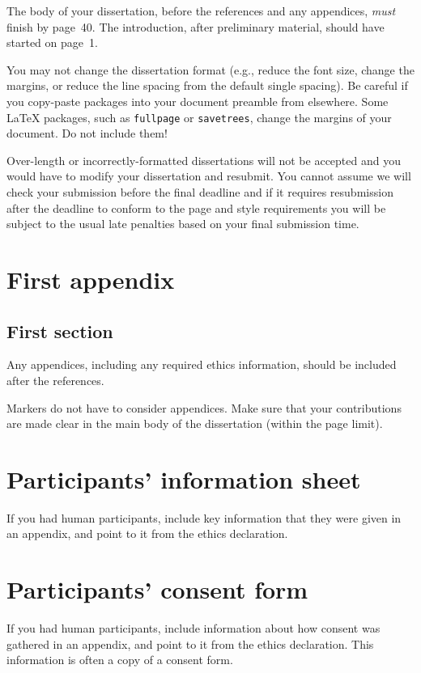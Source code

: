 \documentclass[logo,bsc,singlespacing,parskip,online]{infthesis}
\begin{document}
The body of your dissertation, before the references and any appendices,
\emph{must} finish by page~40. The introduction, after preliminary material,
should have started on page~1.

You may not change the dissertation format (e.g., reduce the font size, change
the margins, or reduce the line spacing from the default single spacing). Be
careful if you copy-paste packages into your document preamble from elsewhere.
Some \LaTeX{} packages, such as \texttt{fullpage} or \texttt{savetrees}, change
the margins of your document. Do not include them!

Over-length or incorrectly-formatted dissertations will not be accepted and you
would have to modify your dissertation and resubmit. You cannot assume we will
check your submission before the final deadline and if it requires resubmission
after the deadline to conform to the page and style requirements you will be
subject to the usual late penalties based on your final submission time.

% 

% 



\appendix

\chapter{First appendix}

\section{First section}

Any appendices, including any required ethics information, should be included
after the references.

Markers do not have to consider appendices. Make sure that your contributions
are made clear in the main body of the dissertation (within the page limit).

\chapter{Participants' information sheet}

If you had human participants, include key information that they were given in
an appendix, and point to it from the ethics declaration.

\chapter{Participants' consent form}

If you had human participants, include information about how consent was
gathered in an appendix, and point to it from the ethics declaration.
This information is often a copy of a consent form.
\end{document}
